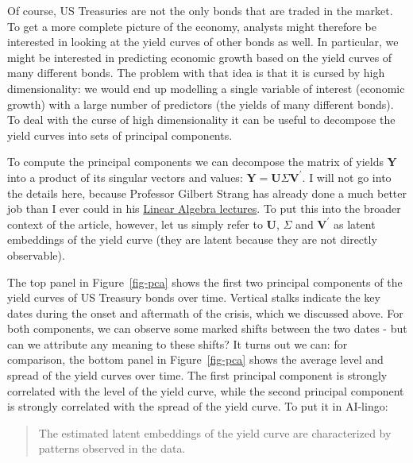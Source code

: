 \documentclass{article}
\theoremstyle{plain}
\theoremstyle{definition}
\theoremstyle{remark}
\begin{document}
Of course, US Treasuries are not the only bonds that are traded in the
market. To get a more complete picture of the economy, analysts might
therefore be interested in looking at the yield curves of other bonds as
well. In particular, we might be interested in predicting economic
growth based on the yield curves of many different bonds. The problem
with that idea is that it is cursed by high dimensionality: we would end
up modelling a single variable of interest (economic growth) with a
large number of predictors (the yields of many different bonds). To deal
with the curse of high dimensionality it can be useful to decompose the
yield curves into sets of principal components.

To compute the principal components we can decompose the matrix of
yields \(\mathbf{Y}\) into a product of its singular vectors and values:
\(\mathbf{Y}=\mathbf{U}\Sigma\mathbf{V}^{\prime}\). I will not go into
the details here, because Professor Gilbert Strang has already done a
much better job than I ever could in his
\href{https://www.youtube.com/watch?v=mBcLRGuAFUk}{Linear Algebra
lectures}. To put this into the broader context of the article, however,
let us simply refer to \(\mathbf{U}\), \(\Sigma\) and
\(\mathbf{V}^{\prime}\) as latent embeddings of the yield curve (they
are latent because they are not directly observable).

The top panel in Figure~\ref{fig-pca} shows the first two principal
components of the yield curves of US Treasury bonds over time. Vertical
stalks indicate the key dates during the onset and aftermath of the
crisis, which we discussed above. For both components, we can observe
some marked shifts between the two dates - but can we attribute any
meaning to these shifts? It turns out we can: for comparison, the bottom
panel in Figure~\ref{fig-pca} shows the average level and spread of the
yield curves over time. The first principal component is strongly
correlated with the level of the yield curve, while the second principal
component is strongly correlated with the spread of the yield curve. To
put it in AI-lingo:

\begin{quote}
The estimated latent embeddings of the yield curve are characterized by
patterns observed in the data.
\end{quote}
\end{document}
